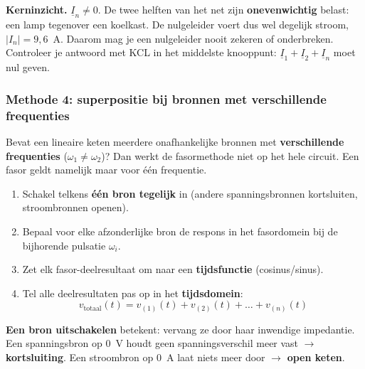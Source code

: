 \documentclass[a4paper,11pt]{article}
\begin{document}
\begin{oefening}
    \textbf{Kerninzicht.} $\underline{I}_n \neq 0$. De twee helften van het net zijn
    \textbf{onevenwichtig} belast: een lamp tegenover een koelkast. De nulgeleider voert dus wel
    degelijk stroom, $|I_n| = 9{,}6$~A. Daarom mag je een nulgeleider nooit zekeren of onderbreken.
    Controleer je antwoord met KCL in het middelste knooppunt:
    $\underline{I}_1 + \underline{I}_2 + \underline{I}_n$ moet nul geven.
\end{oefening}


\subsubsection{Methode 4: superpositie bij bronnen met verschillende frequenties}

Bevat een lineaire keten meerdere onafhankelijke bronnen met \textbf{verschillende frequenties}
($\omega_1 \neq \omega_2$)? Dan werkt de fasormethode niet op het hele circuit. Een fasor geldt
namelijk maar voor één frequentie.

\begin{theorie}
    \begin{enumerate}
        \item Schakel telkens \textbf{één bron tegelijk} in (andere spanningsbronnen kortsluiten, stroombronnen openen).
        \item Bepaal voor elke afzonderlijke bron de respons in het fasordomein bij de bijhorende pulsatie $\omega_i$.
        \item Zet elk fasor-deelresultaat om naar een \textbf{tijdsfunctie} (cosinus/sinus).
        \item Tel alle deelresultaten pas op in het \textbf{tijdsdomein}:
              \[v_{\text{totaal}}(t) = v_{(1)}(t) + v_{(2)}(t) + \dots + v_{(n)}(t)\]
    \end{enumerate}
\end{theorie}

\textbf{Een bron uitschakelen} betekent: vervang ze door haar inwendige impedantie. Een spanningsbron
op $0$~V houdt geen spanningsverschil meer vast $\rightarrow$ \textbf{kortsluiting}. Een stroombron op
$0$~A laat niets meer door $\rightarrow$ \textbf{open keten}.
\end{document}
